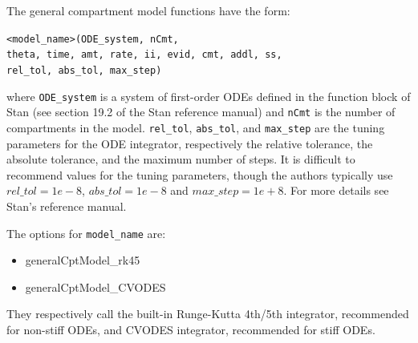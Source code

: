 \documentclass[11pt]{amsart}
\begin{document}
The general compartment model functions have the form:

\texttt{<model\_name>(ODE\_system, nCmt, \\
                              theta, time, amt, rate, ii, evid, cmt, addl, ss, \\
                              rel\_tol, abs\_tol, max\_step)}
                              
where \texttt{ODE\_system} is a system of first-order ODEs defined in the function block of Stan (see section 19.2 of the Stan reference manual) and \texttt{nCmt} is the number of compartments in the model. \texttt{rel\_tol}, \texttt{abs\_tol}, and \texttt{max\_step} are the tuning parameters for the ODE integrator, respectively the relative tolerance, the absolute tolerance, and the maximum number of steps. It is difficult to recommend values for the tuning parameters, though the authors typically use $rel\_tol = 1e-8$, $abs\_tol = 1e-8$ and $max\_step = 1e+8$. For more details see Stan's reference manual.

The options for \texttt{model\_name} are:
\begin{itemize}
  \item generalCptModel\_rk45
  \item generalCptModel\_CVODES
\end{itemize}

They respectively call the built-in Runge-Kutta 4th/5th integrator, recommended for non-stiff ODEs, and CVODES integrator, recommended for stiff ODEs.
\end{document}
